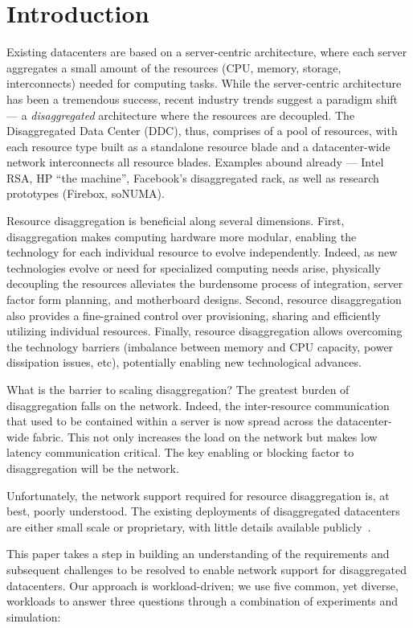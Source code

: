 \section{Introduction}
\label{sec:intro}
Existing datacenters are based on a server-centric architecture, where each server aggregates a small amount of the resources (CPU, memory, storage, interconnects) needed for computing tasks. While the server-centric architecture has been a tremendous success, recent industry trends suggest a paradigm shift --- a {\em disaggregated} architecture where the resources are decoupled. The Disaggregated Data Center (DDC), thus, comprises of a pool of resources, with each resource type built as a standalone resource blade and a datacenter-wide network interconnects all resource blades. Examples abound already --- Intel RSA, HP ``the machine'', Facebook's disaggregated rack, as well as research prototypes (Firebox, soNUMA).

Resource disaggregation is beneficial along several dimensions. First, disaggregation makes computing hardware more modular, enabling the technology for each individual resource to evolve independently. Indeed, as new technologies evolve or need for specialized computing needs arise, physically decoupling the resources alleviates the burdensome process of integration, server factor form planning, and motherboard designs. Second, resource disaggregation also provides a fine-grained control over provisioning, sharing and efficiently utilizing individual resources. Finally, resource disaggregation allows overcoming the technology barriers (imbalance between memory and CPU capacity, power dissipation issues, etc), potentially enabling new technological advances. 

What is the barrier to scaling disaggregation? The greatest burden of disaggregation falls on the network. Indeed, the inter-resource communication that used to be contained within a server is now spread across the datacenter-wide fabric. This not only increases the load on the network but makes low latency communication critical. The key enabling or blocking factor to disaggregation will be the network. 

Unfortunately, the network support required for resource disaggregation is, at best, poorly understood. The existing deployments of disaggregated datacenters are either small scale or proprietary, with little details available publicly~\cite{x1, x2, x3, x4}.  


This paper takes a step in building an understanding of the requirements and subsequent challenges to be resolved to enable network support for disaggregated datacenters. Our approach is workload-driven; we use five common, yet diverse, workloads to answer three questions through a combination of experiments and simulation: 

